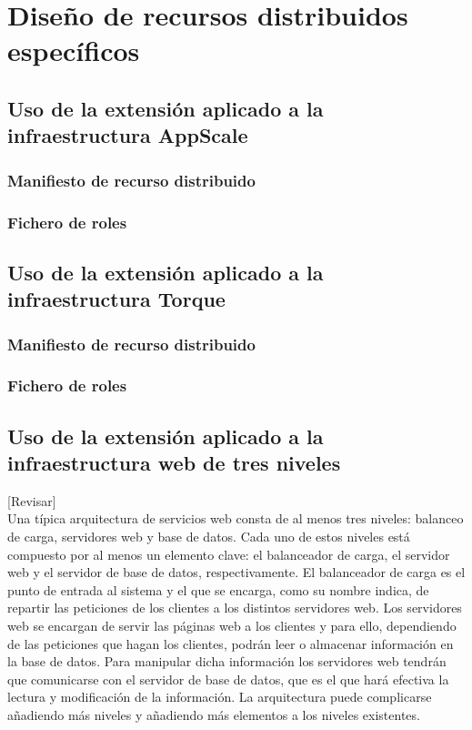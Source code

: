 \chapter{Diseño de recursos distribuidos específicos}
\label{cap:disenyo}

\section{Uso de la extensión aplicado a la infraestructura AppScale}
\subsection{Manifiesto de recurso distribuido}
\subsection{Fichero de roles}


\section{Uso de la extensión aplicado a la infraestructura Torque}
\subsection{Manifiesto de recurso distribuido}
\subsection{Fichero de roles}


\section{Uso de la extensión aplicado a la infraestructura web de tres niveles}

[Revisar]\\

Una típica arquitectura de servicios web consta de al menos tres niveles: balanceo de carga, servidores web y base de datos. Cada uno de estos niveles está compuesto por al menos un elemento clave: el balanceador de carga, el servidor web y el servidor de base de datos, respectivamente. El balanceador de carga es el punto de entrada al sistema y el que se encarga, como su nombre indica, de repartir las peticiones de los clientes a los distintos servidores web. Los servidores web se encargan de servir las páginas web a los clientes y para ello, dependiendo de las peticiones que hagan los clientes, podrán leer o almacenar información en la base de datos. Para manipular dicha información los servidores web tendrán que comunicarse con el servidor de base de datos, que es el que hará efectiva la lectura y modificación de la información. La arquitectura puede complicarse añadiendo más niveles y añadiendo más elementos a los niveles existentes.\\

